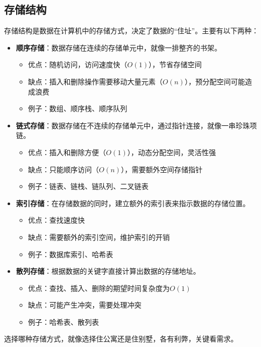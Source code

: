 \documentclass[lang=cn,newtx,10pt,scheme=chinese]{../elegantbook}
\begin{document}
\subsection{存储结构}
存储结构是数据在计算机中的存储方式，决定了数据的“住址”。主要有以下两种：
\begin{itemize}
    \item \textbf{顺序存储}：数据存储在连续的存储单元中，就像一排整齐的书架。
    \begin{itemize}
        \item 优点：随机访问，访问速度快（$O(1)$），节省存储空间
        \item 缺点：插入和删除操作需要移动大量元素（$O(n)$），预分配空间可能造成浪费
        \item 例子：数组、顺序栈、顺序队列
    \end{itemize}
    
    \item \textbf{链式存储}：数据存储在不连续的存储单元中，通过指针连接，就像一串珍珠项链。
    \begin{itemize}
        \item 优点：插入和删除方便（$O(1)$），动态分配空间，灵活性强
        \item 缺点：只能顺序访问（$O(n)$），需要额外空间存储指针
        \item 例子：链表、链栈、链队列、二叉链表
    \end{itemize}
    
    \item \textbf{索引存储}：在存储数据的同时，建立额外的索引表来指示数据的存储位置。
    \begin{itemize}
        \item 优点：查找速度快
        \item 缺点：需要额外的索引空间，维护索引的开销
        \item 例子：数据库索引、哈希表
    \end{itemize}
    
    \item \textbf{散列存储}：根据数据的关键字直接计算出数据的存储地址。
    \begin{itemize}
        \item 优点：查找、插入、删除的期望时间复杂度为$O(1)$
        \item 缺点：可能产生冲突，需要处理冲突
        \item 例子：哈希表、散列表
    \end{itemize}
\end{itemize}
选择哪种存储方式，就像选择住公寓还是住别墅，各有利弊，关键看需求。
\end{document}
